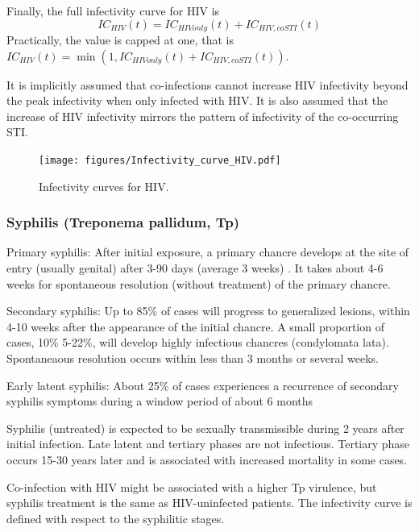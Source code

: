\documentclass[11pt, onecolumn]{article}
\begin{document}
Finally, the full infectivity curve for HIV is
$$ IC_{HIV}(t) = IC_{HIVonly}(t)+IC_{HIV,coSTI}(t)$$
Practically, the value is capped at one, that is $ IC_{HIV}(t) = \min(1,IC_{HIVonly}(t)+IC_{HIV,coSTI}(t))$. 

It is implicitly assumed that co-infections cannot increase HIV infectivity beyond the peak infectivity when only infected with HIV. It is also assumed that the increase of HIV infectivity mirrors the pattern of infectivity of the co-occurring STI.

\begin{figure}[!ht]
\centering
    \texttt{[image: figures/Infectivity\_curve\_HIV.pdf]}
\caption{Infectivity curves for HIV.}
\label{fig:InfectivityCurves}
\end{figure}



 \subsubsection{Syphilis (Treponema pallidum, Tp)}

Primary syphilis: After initial exposure, a primary chancre develops at the site of entry (usually genital) after 3-90 days (average 3 weeks) \cite{Kent:2008ch,Horvath:2011fw}. It takes about 4-6 weeks for spontaneous resolution (without treatment) of the primary chancre.

Secondary syphilis: Up to 85\% of cases will progress to generalized lesions\cite{Horvath:2011fw}, within 4-10 weeks after the appearance of the initial chancre\cite{Kent:2008ch,Horvath:2011fw}. A small proportion of cases, 10\%\cite{Horvath:2011fw} 5-22\%\cite{Kent:2008ch}, will develop highly infectious chancres (condylomata lata). Spontaneaous resolution occurs within less than 3 months\cite{Horvath:2011fw} or several weeks\cite{Kent:2008ch}.

Early latent syphilis: About 25\% of cases experiences a recurrence of secondary syphilis symptoms during a window period of about 6 months

Syphilis (untreated) is expected to be sexually transmissible during 2 years after initial infection\cite{Horvath:2011fw}. Late latent and tertiary phases are not infectious. Tertiary phase occurs 15-30 years later and is associated with increased mortality in some cases. 

Co-infection with HIV might be associated with a higher Tp virulence, but syphilis treatment is the same as HIV-uninfected patients\cite{Kent:2008ch}.
The infectivity curve is defined with respect to the syphilitic stages.
\end{document}
